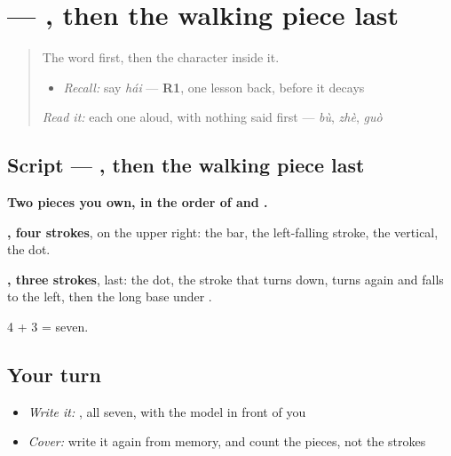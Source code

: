 \section[\texorpdfstring{\zh{还} (hái)}{还 (hái)}]{ — , then the walking piece last}

\label{lesson:ZH-W154-hai-still}



\begin{quote}
The word first, then the character inside it.

\begin{itemize}
\raggedright
  \item \emph{Recall:} say \emph{hái} — \textbf{R1}, one lesson back, before it decays
\end{itemize}

\begin{quote}
  
\end{quote}

\emph{Read it:} each one aloud, with nothing said first — \emph{bù}, \emph{zhè}, \emph{guò}
\end{quote}

\subsection*{Script — , then the walking piece last}

\begin{quote}
\end{quote}

\textbf{Two pieces you own, in the order of  and .}

\textbf{, four strokes}, on the upper right: the bar, the left-falling stroke, the vertical, the dot.

\textbf{, three strokes}, last: the dot, the stroke that turns down, turns again and falls to the left, then the long base under .

4 + 3 = seven.

\subsection*{Your turn}
\begin{itemize}
\raggedright
  \item \emph{Write it:} , all seven, with the model in front of you
  \item \emph{Cover:} write it again from memory, and count the pieces, not the strokes
\end{itemize}

